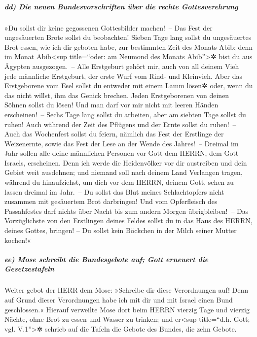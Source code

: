 \hypertarget{dd-die-neuen-bundesvorschriften-uxfcber-die-rechte-gottesverehrung}{%
\subparagraph{dd) Die neuen Bundesvorschriften über die rechte
Gottesverehrung}\label{dd-die-neuen-bundesvorschriften-uxfcber-die-rechte-gottesverehrung}}

 »Du sollst dir keine gegossenen Gottesbilder machen!~--
 Das Fest der ungesäuerten Brote sollst du beobachten!
Sieben Tage lang sollst du ungesäuertes Brot essen, wie ich dir geboten
habe, zur bestimmten Zeit des Monats Abib; denn im Monat
Abib\textless sup title=``oder: am Neumond des Monats
Abib''\textgreater✲ bist du aus Ägypten ausgezogen.~-- 
Alle Erstgeburt gehört mir, auch von all deinem Vieh jede männliche
Erstgeburt, der erste Wurf vom Rind- und Kleinvieh.  Aber
das Erstgeborene vom Esel sollst du entweder mit einem Lamm lösen✲ oder,
wenn du das nicht willst, ihm das Genick brechen. Jeden Erstgeborenen
von deinen Söhnen sollst du lösen! Und man darf vor mir nicht mit leeren
Händen erscheinen!~--  Sechs Tage lang sollst du
arbeiten, aber am siebten Tage sollst du ruhen! Auch während der Zeit
des Pflügens und der Ernte sollst du ruhen!~--  Auch das
Wochenfest sollst du feiern, nämlich das Fest der Erstlinge der
Weizenernte, sowie das Fest der Lese an der Wende des Jahres!~--
 Dreimal im Jahr sollen alle deine männlichen Personen
vor Gott dem HERRN, dem Gott Israels, erscheinen.  Denn
ich werde die Heidenvölker vor dir austreiben und dein Gebiet weit
ausdehnen; und niemand soll nach deinem Land Verlangen tragen, während
du hinaufziehst, um dich vor dem HERRN, deinem Gott, sehen zu lassen
dreimal im Jahr.~--  Du sollst das Blut meines
Schlachtopfers nicht zusammen mit gesäuertem Brot darbringen! Und vom
Opferfleisch des Passahfestes darf nichts über Nacht bis zum andern
Morgen übrigbleiben!~--  Das Vorzüglichste von den
Erstlingen deines Feldes sollst du in das Haus des HERRN, deines Gottes,
bringen! -- Du sollst kein Böckchen in der Milch seiner Mutter kochen!«

\hypertarget{ee-mose-schreibt-die-bundesgebote-auf-gott-erneuert-die-gesetzestafeln}{%
\subparagraph{ee) Mose schreibt die Bundesgebote auf; Gott erneuert die
Gesetzestafeln}\label{ee-mose-schreibt-die-bundesgebote-auf-gott-erneuert-die-gesetzestafeln}}

 Weiter gebot der HERR dem Mose: »Schreibe dir diese
Verordnungen auf! Denn auf Grund dieser Verordnungen habe ich mit dir
und mit Israel einen Bund geschlossen.«  Hierauf
verweilte Mose dort beim HERRN vierzig Tage und vierzig Nächte, ohne
Brot zu essen und Wasser zu trinken; und er\textless sup title=``d.h.
Gott; vgl. V.1''\textgreater✲ schrieb auf die Tafeln die Gebote des
Bundes, die zehn Gebote.

